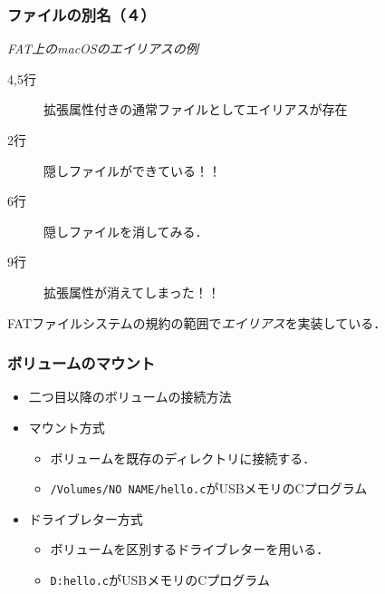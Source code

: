 \documentclass{beamer}                   %
\begin{document}
\begin{frame}
  \frametitle{ファイルの別名（４）}
  \emph{FAT上のmacOSのエイリアスの例}
  \begin{description}
    \item[4,5行] 拡張属性付きの通常ファイルとしてエイリアスが存在
    \item[2行]   隠しファイルができている！！
    \item[6行]   隠しファイルを消してみる．
    \item[9行]   拡張属性が消えてしまった！！
  \end{description}
  FATファイルシステムの規約の範囲で\emph{エイリアス}を実装している．
  \vfill
\end{frame}

\begin{frame}
  \frametitle{ボリュームのマウント}
  \begin{itemize}
  \item 二つ目以降のボリュームの接続方法
  \item マウント方式
    \begin{itemize}
    \item ボリュームを既存のディレクトリに接続する．
    \item \texttt{/Volumes/NO NAME/hello.c}がUSBメモリのCプログラム
    \end{itemize}
  \item ドライブレター方式
    \begin{itemize}
    \item ボリュームを区別するドライブレターを用いる．
    \item \texttt{D:{\bs}hello.c}がUSBメモリのCプログラム
    \end{itemize}
  \end{itemize}
\end{frame}
\end{document}

